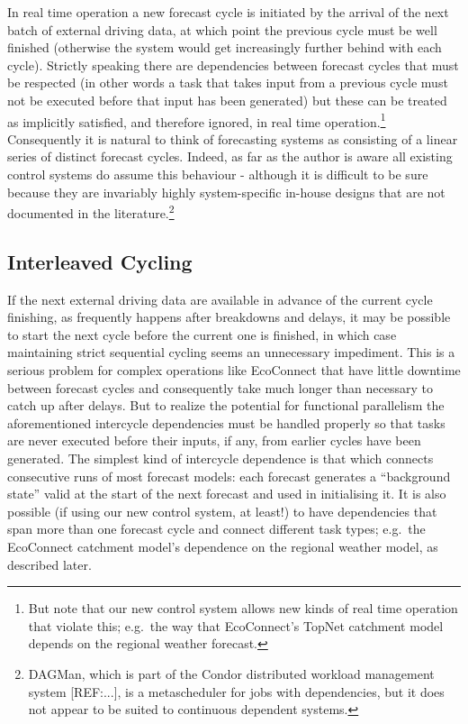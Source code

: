 \documentclass[11pt,a4paper]{article}
\begin{document}
In real time operation a new forecast cycle is initiated by the arrival
of the next batch of external driving data, at which point the previous
cycle must be well finished (otherwise the system would get increasingly
further behind with each cycle). Strictly speaking there are
dependencies between forecast cycles that must be respected (in other
words a task that takes input from a previous cycle must not be executed
before that input has been generated) but these can be treated as
implicitly satisfied, and therefore ignored, in real time
operation.\footnote{But note that our new control system allows new
kinds of real time operation that violate this; e.g.\ the way that
EcoConnect's TopNet catchment model depends on the regional weather
forecast.} Consequently it is natural to think of forecasting systems as
consisting of a linear series of distinct forecast cycles. Indeed, as
far as the author is aware all existing control systems do assume this
behaviour - although it is difficult to be sure because they are
invariably highly system-specific in-house designs that are not
documented in the literature.\footnote{DAGMan, which is part of the
Condor distributed workload management system [REF:...], is a
metascheduler for jobs with dependencies, but it does not appear
to be suited to continuous dependent systems.} 

\subsection{Interleaved Cycling}

If the next external driving data are available in advance of the
current cycle finishing, as frequently happens after breakdowns and
delays, it may be possible to start the next cycle before the current
one is finished, in which case maintaining strict sequential cycling
seems an unnecessary impediment.  This is a serious problem for complex
operations like EcoConnect that have little downtime between forecast
cycles and consequently take much longer than necessary to catch up
after delays.  But to realize the potential for functional parallelism
the aforementioned intercycle dependencies must be handled properly so
that tasks are never executed before their inputs, if any, from earlier
cycles have been generated. The simplest kind of intercycle dependence
is that which connects consecutive runs of most forecast models: each
forecast generates a ``background state'' valid at the start of the next
forecast and used in initialising it. It is also possible (if using our
new control system, at least!) to have dependencies that span more than
one forecast cycle and connect different task types; e.g.\ the
EcoConnect catchment model's dependence on the regional weather model,
as described later. 
\end{document}
